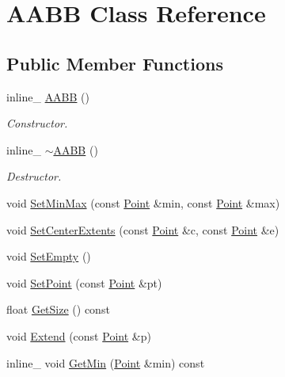 \hypertarget{class_a_a_b_b}{\section{A\+A\+B\+B Class Reference}
\label{class_a_a_b_b}
}
\subsection*{Public Member Functions}
\begin{DoxyCompactItemize}
\item 
\hypertarget{class_a_a_b_b_ad318cad1a1e40ecb7560f953d439527c}{inline\+\_\+ \hyperlink{class_a_a_b_b_ad318cad1a1e40ecb7560f953d439527c}{A\+A\+B\+B} ()}\label{class_a_a_b_b_ad318cad1a1e40ecb7560f953d439527c}

\begin{DoxyCompactList}\small\item\em Constructor. \end{DoxyCompactList}\item 
\hypertarget{class_a_a_b_b_a013e16f21145d12bd19b384b31055fb2}{inline\+\_\+ \hyperlink{class_a_a_b_b_a013e16f21145d12bd19b384b31055fb2}{$\sim$\+A\+A\+B\+B} ()}\label{class_a_a_b_b_a013e16f21145d12bd19b384b31055fb2}

\begin{DoxyCompactList}\small\item\em Destructor. \end{DoxyCompactList}\item 
void \hyperlink{class_a_a_b_b_aefd07f1b846deede5a40294e0128357d}{Set\+Min\+Max} (const \hyperlink{class_point}{Point} \&min, const \hyperlink{class_point}{Point} \&max)
\item 
void \hyperlink{class_a_a_b_b_a926e591a06add61aaf40f4660bd52438}{Set\+Center\+Extents} (const \hyperlink{class_point}{Point} \&c, const \hyperlink{class_point}{Point} \&e)
\item 
void \hyperlink{class_a_a_b_b_acbb23abc7e661b2388c17fca54cc80ed}{Set\+Empty} ()
\item 
void \hyperlink{class_a_a_b_b_a5fa5fe0ce941e8c991775be34337acad}{Set\+Point} (const \hyperlink{class_point}{Point} \&pt)
\item 
float \hyperlink{class_a_a_b_b_ad40b364b3fd436764dd297336a902040}{Get\+Size} () const 
\item 
void \hyperlink{class_a_a_b_b_af1ec90a9de45e8ee2a0f3589404f2981}{Extend} (const \hyperlink{class_point}{Point} \&p)
\item 
\hypertarget{class_a_a_b_b_ac8cb1707616aba70f650bb017476531e}{inline\+\_\+ void \hyperlink{class_a_a_b_b_ac8cb1707616aba70f650bb017476531e}{Get\+Min} (\hyperlink{class_point}{Point} \&min) const }\label{class_a_a_b_b_ac8cb1707616aba70f650bb017476531e}


\end{DoxyCompactItemize}
